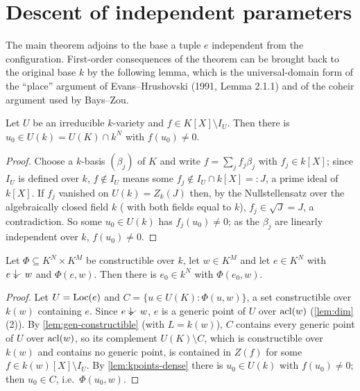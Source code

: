 \section{Descent of independent parameters}
\label{sec:descent}

The main theorem adjoins to the base a tuple $e$ independent from the configuration.
First-order consequences of the theorem can be brought back to the original base $k$
by the following lemma, which is the universal-domain form of the ``place''
argument of Evans--Hrushovski (1991, Lemma 2.1.1) and of the coheir argument used by
Bays--Zou.

\begin{lemma}\label{lem:kpoints-dense}
Let $U$ be an irreducible $k$-variety and $f\in K[X]\setminus I_U$.  Then there is
$u_0\in U(k)=U(K)\cap k^N$ with $f(u_0)\ne0$.
\end{lemma}
\begin{proof}
Choose a $k$-basis $(\beta_j)$ of $K$ and write $f=\sum_j f_j\beta_j$ with $f_j\in k[X]$;
since $I_U$ is defined over $k$, $f\notin I_U$ means some $f_j\notin I_U\cap k[X]=:J$,
a prime ideal of $k[X]$.  If $f_j$ vanished on $U(k)=Z_k(J)$ then, by the Nullstellensatz
over the algebraically closed field $k$ (
with both fields equal to $k$), $f_j\in\sqrt J=J$, a contradiction.  So some
$u_0\in U(k)$ has $f_j(u_0)\neq0$; as the $\beta_j$ are linearly independent over $k$,
$f(u_0)\ne0$.
\end{proof}

\begin{theorem}[descent]\label{thm:descent}
Let $\Phi\subseteq K^{N}\times K^{M}$ be constructible over $k$, let $w\in K^M$ and let
$e\in K^N$ with $e\ind{}w$ and $\Phi(e,w)$.  Then there is $e_0\in k^N$ with $\Phi(e_0,w)$.
\end{theorem}
\begin{proof}
Let $U=\operatorname{Loc}(e)$ and $C=\{u\in U(K):\Phi(u,w)\}$, a set constructible over $k(w)$
containing $e$.  Since $e\ind{}w$, $e$ is a generic point of $U$ over $\operatorname{acl}(w)$
(\cref{lem:dim}(2)).  By \cref{lem:gen-constructible} (with $L=k(w)$), $C$ contains
every generic point of $U$ over $\operatorname{acl}(w)$, so its complement $U(K)\setminus C$, which is
constructible over $k(w)$ and contains no generic point, is contained in $Z(f)$ for some
$f\in k(w)[X]\setminus I_U$.  By \cref{lem:kpoints-dense} there is $u_0\in U(k)$ with
$f(u_0)\ne0$; then $u_0\in C$, i.e.\ $\Phi(u_0,w)$.
\end{proof}

